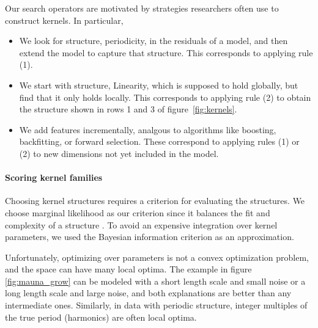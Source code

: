 \documentclass[twoside]{article}
\begin{document}
Our search operators are motivated by strategies researchers often use to construct kernels.
In particular,
\begin{itemize}
\item We look for structure, \eg periodicity, in the residuals of a model, and then extend the model to capture that structure.
This corresponds to applying rule (1).
\item We start with structure, \eg Linearity, which is supposed to hold globally, but find that it only holds locally.
This corresponds to applying rule (2) to obtain the structure shown in rows 1 and 3 of figure~\ref{fig:kernels}.
\item We add features incrementally, analgous to algorithms like boosting, backfitting, or forward selection.
These correspond to applying rules (1) or (2) to new dimensions not yet included in the model.
\end{itemize}

\paragraph{Scoring kernel families}

Choosing kernel structures requires a criterion for evaluating the structures.
We choose marginal likelihood as our criterion since it balances the fit and complexity of a structure \citep[e.g.][]{rasmussen2001occam}.
To avoid an expensive integration over kernel parameters, we used the Bayesian information criterion \citep{schwarz1978estimating} as an approximation.

Unfortunately, optimizing over parameters is not a convex optimization problem, and the space can have many local optima.
The example in figure \ref{fig:mauna_grow} can be modeled with a short length scale and small noise or a long length scale and large noise, and both explanations are better than any intermediate ones.
Similarly, in data with periodic structure, integer multiples of the true period (\ie harmonics) are often local optima. 
\end{document}
